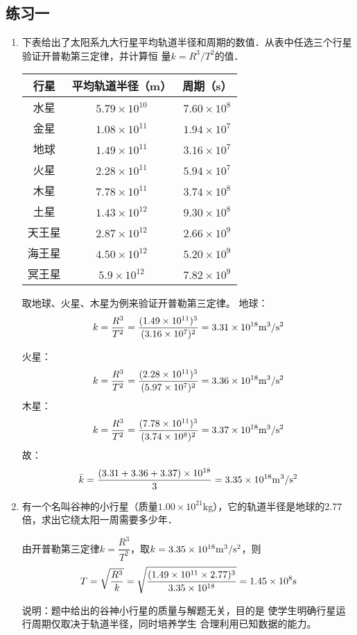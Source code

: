 \subsection{练习一}
\begin{enumerate}
	\item 下表给出了太阳系九大行星平均轨道半径和周期的数值．从表中任选三个行星验证开普勒第三定律，并计算恒
	量$k=R^3/T^2$的值．
\begin{center}
	\begin{tabular}{ccc}
\hline
行星    &  平均轨道半径（m）  & 周期（s）\\
\hline
水星      &  $5.79\times 10^{10}$    & $7.60\times 10^8$ \\ 
金星    &  $1.08\times 10^{11}$    &  $1.94\times 10^7$ \\ 
地球    &  $1.49\times 10^{11}$    &  $3.16\times 10^7$ \\ 
火星    &  $2.28\times 10^{11}$    &  $5.94\times 10^7$ \\ 
木星    &  $7.78\times 10^{11}$    &  $3.74\times 10^8$ \\ 
土星    &  $1.43\times 10^{12}$    &  $9.30\times 10^8$ \\ 
天王星    & $2.87\times 10^{12}$     &  $2.66\times 10^9$ \\ 
海王星    &  $4.50\times 10^{12}$    &  $5.20\times 10^9$ \\ 
冥王星    & $5.9\times 10^{12}$     &  $7.82\times 10^9$ \\ 
\hline
	\end{tabular}
\end{center}


\begin{solution}
	取地球、火星、木星为例来验证开普勒第三定律。
地球：
\[k=\frac{R^3}{T^2}=\frac{(1.49\times 10^{11})^3}{(3.16\times 10^{7})^2} =3.31\times 10^{18}  {\rm m^3/s^2}\]

火星：\[k=\frac{R^3}{T^2}=\frac{(2.28\times 10^{11})^3}{(5.97\times 10^{7})^2} =3.36\times 10^{18}   {\rm m^3/s^2}\]
木星：\[k=\frac{R^3}{T^2}=\frac{(7.78\times 10^{11})^3}{(3.74\times 10^{8})^2} = 3.37\times 10^{18}  {\rm m^3/s^2}\]
故：\[\bar k=\frac{(3.31+3.36+3.37)\times 10^{18} }{3}=3.35\times 10^{18}  {\rm m^3/s^2}\]
\end{solution}

\item 有一个名叫谷神的小行星（质量$1.00\times 10^{21}$kg），它的轨道半径是地球的2.77倍，求出它绕太阳一周需要多少年．

\begin{solution}
	由开普勒第三定律$k=\dfrac{R^3}{T^2}$，取$k=3.35\times 10^{18}  {\rm m^3/s^2}$，则
\[T=\sqrt{\frac{R^3}{k}}=\sqrt{\frac{(1.49\times 10^{11}\times 2.77)^3}{3.35\times 10^{18}}}=1.45\times 10^8{\rm s}\]
\end{solution}
说明：题中给出的谷神小行星的质量与解题无关，目的是
使学生明确行星运行周期仅取决于轨道半径，同时培养学生
合理利用已知数据的能力。
\end{enumerate}





